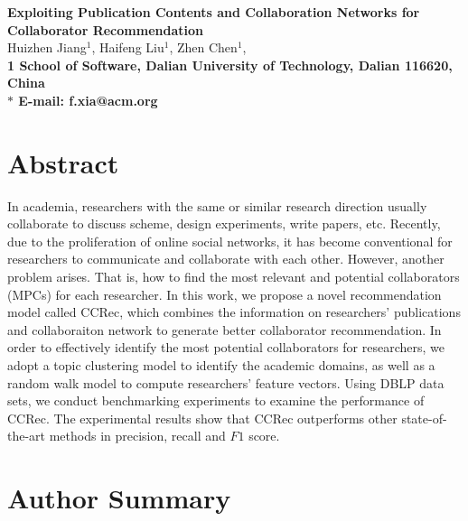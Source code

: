 \pagestyle{myheadings}





\linenumbers

\begin{flushleft}
{\Large
\textbf{Exploiting Publication Contents and Collaboration Networks for Collaborator Recommendation}
}
\\
Huizhen Jiang$^{1}$,
Haifeng Liu$^{1}$,
Zhen Chen$^{1}$,
\\
\bf{1} School of Software, Dalian University of Technology, Dalian 116620, China
\\
$\ast$ E-mail: f.xia@acm.org
\end{flushleft}

\section*{Abstract}
In academia, researchers with the same or similar research direction usually collaborate to discuss scheme, design experiments, write papers, etc. Recently, due to the proliferation of online social networks, it has become conventional for researchers to communicate and collaborate with each other. However, another problem arises. That is, how to find the most relevant and potential collaborators (MPCs) for each researcher. In this work, we propose a novel recommendation model called CCRec, which combines the information on researchers' publications and collaboraiton network to generate better collaborator recommendation. In order to effectively identify the most potential collaborators for researchers, we adopt a topic clustering model to identify the academic domains, as well as a random walk model to compute researchers' feature vectors. Using DBLP data sets, we conduct benchmarking experiments to examine the performance of CCRec. The experimental results show that CCRec outperforms other state-of-the-art methods in precision, recall and $F1$ score.

\section*{Author Summary}



